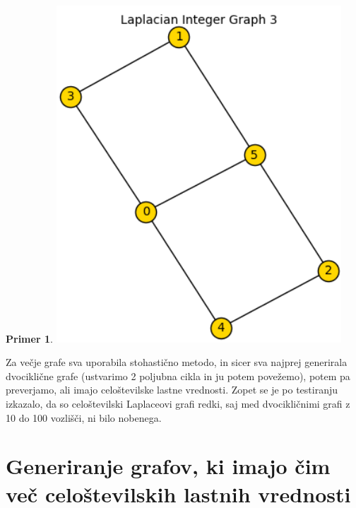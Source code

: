\documentclass{article}
\newtheorem{primer}{Primer}
\begin{document}
\begin{primer}
\begin{minipage}{0.3\textwidth}
    \end{minipage}
    \begin{minipage}{0.3\textwidth}
        \centering
        \includegraphics[width=0.8\textwidth]{dvociklični3.png}
    \end{minipage}
    \par
    
\end{primer}

Za večje grafe sva uporabila stohastično metodo, in sicer sva najprej generirala dvociklične grafe (ustvarimo
2 poljubna cikla in ju potem povežemo), potem pa preverjamo, ali imajo celoštevilske lastne vrednosti. Zopet se je po testiranju izkazalo, da so celoštevilski
Laplaceovi grafi redki, saj med dvocikličnimi grafi z 10 do 100 vozlišči, ni bilo nobenega.

\section{Generiranje grafov, ki imajo čim več celoštevilskih lastnih vrednosti}
\end{document}

